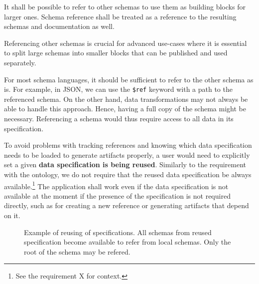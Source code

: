 \begin{requirement}
  It shall be possible to refer to other schemas to use them as building blocks for larger ones. Schema reference shall be treated as a reference to the resulting schemas and documentation as well.
  \label{analysis/requirement/schema-reference}
\end{requirement}

Referencing other schemas is crucial for advanced use-cases where it is essential to split large schemas into smaller blocks that can be published and used separately.

For most schema languages, it should be sufficient to refer to the other schema as is. For example, in JSON, we can use the \verb|$ref| keyword with a path to the referenced schema. On the other hand, data transformations may not always be able to handle this approach. Hence, having a full copy of the schema might be necessary. Referencing a schema would thus require access to all data in its specification.

To avoid problems with tracking references and knowing which data specification needs to be loaded to generate artifacts properly, a user would need to explicitly set a given \textbf{data specification is being reused}. Similarly to the requirement with the ontology, we do not require that the reused data specification be always available.\footnote{See the requirement X for context.} The application shall work even if the data specification is not available at the moment if the presence of the specification is not required directly, such as for creating a new reference or generating artifacts that depend on it.

\begin{figure}[h!]\centering
  \caption{Example of reusing of specifications. All schemas from reused specification become available to refer from local schemas. Only the root of the schema may be refered.}
\end{figure}